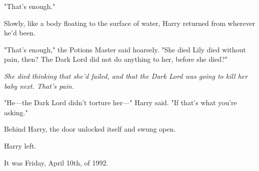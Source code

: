 "That's enough."

Slowly, like a body floating to the surface of water, Harry returned from
wherever he'd been.

"That's enough," the Potions Master said hoarsely. "She died{\el} Lily died
without pain, then? The Dark Lord{\el} did not do anything to her, before
she died?"

\emph{She died thinking that she'd failed, and that the Dark Lord was going to
kill her baby next. That's pain.}

"He—the Dark Lord didn't torture her—" Harry said. "If that's what you're
asking."

Behind Harry, the door unlocked itself and swung open.

Harry left.

It was Friday, April 10th, of 1992.
